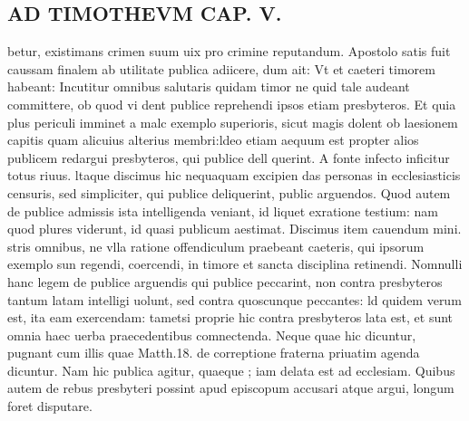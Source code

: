 \documentclass{article}
\begin{document}
\begin{pages}
\section*{AD TIMOTHEVM CAP. V. }
\marginpar{[ p.116 ]}\pstart betur, existimans crimen suum uix pro crimine reputandum. Apostolo satis fuit caussam finalem ab utilitate publica adiicere, dum ait: Vt et caeteri timorem habeant: Incutitur omnibus salutaris quidam timor ne quid tale audeant committere, ob quod vi dent publice reprehendi ipsos etiam presbyteros. Et quia plus periculi imminet a malc exemplo superioris, sicut magis dolent ob laesionem capitis quam alicuius alterius membri:ldeo etiam aequum est propter alios publicem redargui presbyteros, qui publice dell querint. A fonte infecto inficitur totus riuus. ltaque discimus hic nequaquam excipien das personas in ecclesiasticis censuris, sed simpliciter, qui publice deliquerint, public arguendos. Quod autem de publice admissis ista intelligenda veniant, id liquet exratione testium: nam quod plures viderunt, id quasi publicum aestimat. Discimus item cauendum mini. stris omnibus, ne vlla ratione offendiculum praebeant caeteris, qui ipsorum exemplo sun regendi, coercendi, in timore et sancta disciplina retinendi. Nomnulli hanc legem de publice arguendis qui publice peccarint, non contra presbyteros tantum latam intelligi uolunt, sed contra quoscunque peccantes: ld quidem verum est, ita eam exercendam: tametsi proprie hic contra presbyteros lata est, et sunt omnia haec uerba praecedentibus comnectenda. Neque  quae hic dicuntur, pugnant cum illis quae Matth.18. de correptione fraterna priuatim agenda dicuntur. Nam hic publica agitur, quaeque ; iam delata est ad ecclesiam. Quibus autem de rebus presbyteri possint apud episcopum accusari atque argui, longum foret disputare.  \pend
{}
{}

\end{pages}
\end{document}
